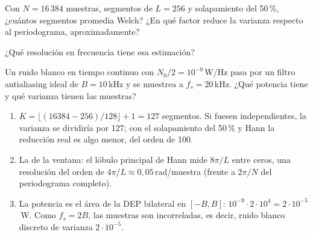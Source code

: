 \documentclass[11pt,a4paper]{scrartcl}
\begin{document}
\begin{ejercicio}
  \begin{incisos}[1]
    \item Con $N=16\,384$ muestras, segmentos de $L=256$ y solapamiento del 50\,\%, ¿cuántos segmentos promedia Welch? ¿En qué factor reduce la varianza respecto al periodograma, aproximadamente?
    \item ¿Qué resolución en frecuencia tiene esa estimación?
    \item Un ruido blanco en tiempo continuo con $N_0/2=10^{-9}$\,W/Hz pasa por un filtro antialiasing ideal de $B=10$\,kHz y se muestrea a $f_s=20$\,kHz. ¿Qué potencia tiene y qué varianza tienen las muestras?
  \end{incisos}
\end{ejercicio}
\begin{solucion}
  \begin{enumerate}[label=\alph*)]
    \item $K=\lfloor(16384-256)/128\rfloor+1=127$ segmentos. Si fuesen independientes, la varianza se dividiría por 127; con el solapamiento del 50\,\% y Hann la reducción real es algo menor, del orden de 100.
    \item La de la ventana: el lóbulo principal de Hann mide $8\pi/L$ entre ceros, una resolución del orden de $4\pi/L\approx0{,}05$\,rad/muestra (frente a $2\pi/N$ del periodograma completo).
    \item La potencia es el área de la DEP bilateral en $[-B,B]$: $10^{-9}\cdot2\cdot10^4=2\cdot10^{-5}$\,W. Como $f_s=2B$, las muestras son incorreladas, es decir, ruido blanco discreto de varianza $2\cdot10^{-5}$.
  \end{enumerate}
\end{solucion}
\end{document}
